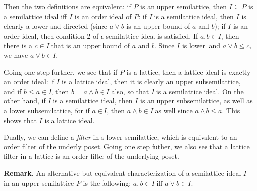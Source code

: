 \documentclass[12pt]{article}
\begin{document}
Then the two definitions are equivalent: if $P$ is an upper semilattice, then $I\subseteq P$ is a semilattice ideal iff $I$ is an order ideal of $P$:  if $I$ is a semilattice ideal, then $I$ is clearly a lower and directed (since $a\vee b$ is an upper bound of $a$ and $b$); if $I$ is an order ideal, then condition 2 of a semilattice ideal is satisfied.  If $a,b\in I$, then there is a $c\in I$ that is an upper bound of $a$ and $b$.  Since $I$ is lower, and $a\vee b\le c$, we have $a\vee b\in I$.

Going one step further, we see that if $P$ is a lattice, then a lattice ideal is exactly an order ideal:  if $I$ is a lattice ideal, then it is clearly an upper subsemilattice, and if $b\le a\in I$, then $b=a\wedge b\in I$ also, so that $I$ is a semilattice ideal.  On the other hand, if $I$ is a semilattice ideal, then $I$ is an upper subsemilattice, as well as a lower subsemilattice, for if $a\in I$, then $a\wedge b\in I$ as well since $a\wedge b\le a$.  This shows that  $I$ is a lattice ideal.

Dually, we can define a \emph{filter} in a lower semilattice, which is equivalent to an order filter of the underly poset.  Going one step futher, we also see that a lattice filter in a lattice is an order filter of the underlying poset.

\textbf{Remark}.  An alternative but equivalent characterization of a semilattice ideal $I$ in an upper semilattice $P$ is the following: $a,b\in I$ iff $a\vee b\in I$.
\end{document}
